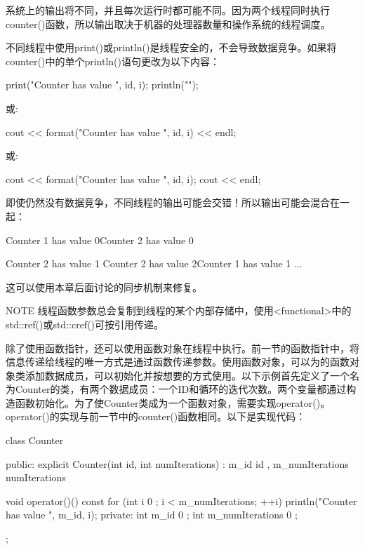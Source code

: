 系统上的输出将不同，并且每次运行时都可能不同。因为两个线程同时执行counter()函数，所以输出取决于机器的处理器数量和操作系统的线程调度。

不同线程中使用print()或println()是线程安全的，不会导致数据竞争。如果将counter()中的单个println()语句更改为以下内容：

\begin{cpp}
print("Counter {} has value {}", id, i);
println("");
\end{cpp}

或:

\begin{cpp}
cout << format("Counter {} has value {}", id, i) << endl;
\end{cpp}

或:

\begin{cpp}
cout << format("Counter {} has value {}", id, i);
cout << endl;
\end{cpp}

即使仍然没有数据竞争，不同线程的输出可能会交错！所以输出可能会混合在一起：

\begin{shell}
Counter 1 has value 0Counter 2 has value 0

Counter 2 has value 1
Counter 2 has value 2Counter 1 has value 1
...
\end{shell}

这可以使用本章后面讨论的同步机制来修复。

\begin{myNotic}{NOTE}
线程函数参数总会复制到线程的某个内部存储中，使用<functional>中的std::ref()或std::cref()可按引用传递。
\end{myNotic}


除了使用函数指针，还可以使用函数对象在线程中执行。前一节的函数指针中，将信息传递给线程的唯一方式是通过函数传递参数。使用函数对象，可以为的函数对象类添加数据成员，可以初始化并按想要的方式使用。以下示例首先定义了一个名为Counter的类，有两个数据成员：一个ID和循环的迭代次数。两个变量都通过构造函数初始化。为了使Counter类成为一个函数对象，需要实现operator()。operator()的实现与前一节中的counter()函数相同。以下是实现代码：

\begin{cpp}
class Counter
{
    public:
        explicit Counter(int id, int numIterations)
            : m_id { id }, m_numIterations { numIterations } { }

        void operator()() const
        {
            for (int i { 0 }; i < m_numIterations; ++i) {
                println("Counter {} has value {}", m_id, i);
            }
        }
    private:
        int m_id { 0 };
        int m_numIterations { 0 };
};
\end{cpp}

